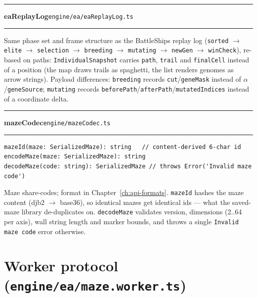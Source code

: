 \documentclass[11pt,a4paper]{report}
\newcommand{\srcfile}[1]{\texttt{\small #1}}   %
\newcommand{\ts}[1]{\texttt{#1}}               %
\newenvironment{apientry}[2]{%
  \par\medskip\noindent
  \begin{minipage}{\textwidth}
  \hrule\vspace{0.6ex}
  {\large\ttfamily\bfseries #1}\hfill{\footnotesize\srcfile{#2}}
  \vspace{0.4ex}\hrule\medskip
}{%
  \end{minipage}\par\medskip
}
\begin{document}
\begin{apientry}{eaReplayLog}{engine/ea/eaReplayLog.ts}
Same phase set and frame structure as the BattleShips replay log
(\ts{sorted} $\to$ \ts{elite} $\to$ \ts{selection} $\to$ \ts{breeding}
$\to$ \ts{mutating} $\to$ \ts{newGen} $\to$ \ts{winCheck}), re-based on
paths: \ts{IndividualSnapshot} carries \ts{path}, \ts{trail} and
\ts{finalCell} instead of a position (the map draws trails as spaghetti,
the list renders genomes as arrow strings). Payload differences:
\ts{breeding} records \ts{cut}/\ts{geneMask} instead of
$\alpha$/\ts{geneSource}; \ts{mutating} records
\ts{beforePath}/\ts{afterPath}/\ts{mutatedIndices} instead of a
coordinate delta.
\end{apientry}

\begin{apientry}{mazeCodec}{engine/mazeCodec.ts}
\begin{lstlisting}
mazeId(maze: SerializedMaze): string   // content-derived 6-char id
encodeMaze(maze: SerializedMaze): string
decodeMaze(code: string): SerializedMaze // throws Error('Invalid maze code')
\end{lstlisting}
Maze share-codes; format in Chapter~\ref{ch:api-formats}. \ts{mazeId}
hashes the maze content (djb2 $\to$ base36), so identical mazes get
identical ids --- what the saved-maze library de-duplicates on.
\ts{decodeMaze} validates version, dimensions (2..64 per axis), wall
string length and marker bounds, and throws a single
\ts{Invalid maze code} error otherwise.
\end{apientry}

\section{Worker protocol (\srcfile{engine/ea/maze.worker.ts})}
\end{document}
